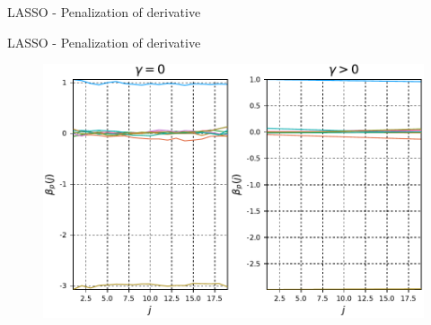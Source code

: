 \documentclass[11pt]{beamer}
\begin{document}
\begin{frame}{LASSO - Penalization of derivative}
%

\end{frame}

\begin{frame}{LASSO - Penalization of derivative}

\begin{figure}
\centering
\includegraphics[width=0.9\linewidth]{Images/Lambda10-gamma03.pdf}
\end{figure}

\end{frame}
\end{document}

